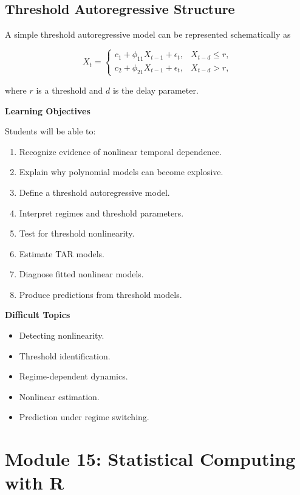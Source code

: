 \documentclass[11pt,a4paper]{article}
\begin{document}
\subsection{Threshold Autoregressive Structure}

A simple threshold autoregressive model can be represented schematically as

\[
X_t=
\begin{cases}
c_1+\phi_{11}X_{t-1}+\epsilon_t,
& X_{t-d}\leq r,\\[4pt]
c_2+\phi_{21}X_{t-1}+\epsilon_t,
& X_{t-d}>r,
\end{cases}
\]

where $r$ is a threshold and $d$ is the delay parameter.

\textbf{Learning Objectives}

Students will be able to:

\begin{enumerate}
    \item Recognize evidence of nonlinear temporal dependence.
    \item Explain why polynomial models can become explosive.
    \item Define a threshold autoregressive model.
    \item Interpret regimes and threshold parameters.
    \item Test for threshold nonlinearity.
    \item Estimate TAR models.
    \item Diagnose fitted nonlinear models.
    \item Produce predictions from threshold models.
\end{enumerate}

\textbf{Difficult Topics}

\begin{itemize}
    \item Detecting nonlinearity.
    \item Threshold identification.
    \item Regime-dependent dynamics.
    \item Nonlinear estimation.
    \item Prediction under regime switching.
\end{itemize}

\section{Module 15: Statistical Computing with R}
\end{document}
